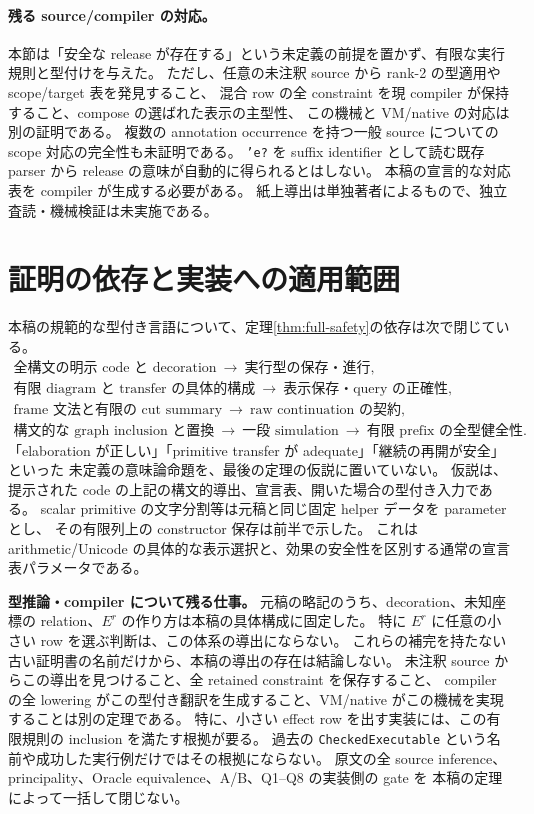 \documentclass[11pt,a4paper]{article}
\begin{document}
\paragraph{残る source/compiler の対応。}
本節は「安全な release が存在する」という未定義の前提を置かず、有限な実行規則と型付けを与えた。
ただし、任意の未注釈 source から rank-2 の型適用や scope/target 表を発見すること、
混合 row の全 constraint を現 compiler が保持すること、compose の選ばれた表示の主型性、
この機械と VM/native の対応は別の証明である。
複数の annotation occurrence を持つ一般 source についての scope 対応の完全性も未証明である。
\texttt{'e?} を suffix identifier として読む既存 parser から release の意味が自動的に得られるとはしない。
本稿の宣言的な対応表を compiler が生成する必要がある。
紙上導出は単独著者によるもので、独立査読・機械検証は未実施である。

\section{証明の依存と実装への適用範囲}
\label{sec:remaining}

本稿の規範的な型付き言語について、定理\ref{thm:full-safety}の依存は次で閉じている。
\[
\begin{gathered}
\text{全構文の明示 code と decoration}
\ \longrightarrow\ \text{実行型の保存・進行},\\
\text{有限 diagram と transfer の具体的構成}
\ \longrightarrow\ \text{表示保存・query の正確性},\\
\text{frame 文法と有限の cut summary}
\ \longrightarrow\ \text{raw continuation の契約},\\
\text{構文的な graph inclusion と置換}
\ \longrightarrow\ \text{一段 simulation}
\ \longrightarrow\ \text{有限 prefix の全型健全性}.
\end{gathered}
\]
「elaboration が正しい」「primitive transfer が adequate」「継続の再開が安全」といった
未定義の意味論命題を、最後の定理の仮説に置いていない。
仮説は、提示された code の上記の構文的導出、宣言表、開いた場合の型付き入力である。
scalar primitive の文字分割等は元稿と同じ固定 helper データを parameter とし、
その有限列上の constructor 保存は前半で示した。
これは arithmetic/Unicode の具体的な表示選択と、効果の安全性を区別する通常の宣言表パラメータである。

\textbf{型推論・compiler について残る仕事。}
元稿の略記のうち、decoration、未知座標の relation、\(E^r\) の作り方は本稿の具体構成に固定した。
特に \(E^r\) に任意の小さい row を選ぶ判断は、この体系の導出にならない。
これらの補完を持たない古い証明書の名前だけから、本稿の導出の存在は結論しない。
未注釈 source からこの導出を見つけること、全 retained constraint を保存すること、
compiler の全 lowering がこの型付き翻訳を生成すること、VM/native がこの機械を実現することは別の定理である。
特に、小さい effect row を出す実装には、この有限規則の inclusion を満たす根拠が要る。
過去の \texttt{CheckedExecutable} という名前や成功した実行例だけではその根拠にならない。
原文の全 source inference、principality、Oracle equivalence、A/B、Q1--Q8 の実装側の gate を
本稿の定理によって一括して閉じない。
\end{document}
